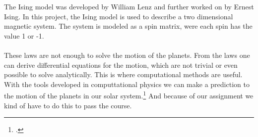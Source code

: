 The Ising model was developed by William Lenz and further worked on by Ernest Ising. In this project, the Ising model is used to describe a two dimensional magnetic system. The system is modeled as a spin matrix, were each spin has the value 1 or -1.
\\
\\
These laws are not enough to solve the motion of the planets. From the laws one can derive differential equations for the motion, which are not trivial or even possible to solve analytically. This is where computational methods are useful. With the tools developed in computtational physics we can make a prediction to the motion of the planets in our solar system.\footnote{\href{http://www.uio.no/studier/emner/matnat/fys/FYS3150/h17/index.html}{\color{blue}{Semester page for FYS3150 - Autumn 2017}}.} And because of our assignment we kind of have to do this to pass the course.\cite{project4}



